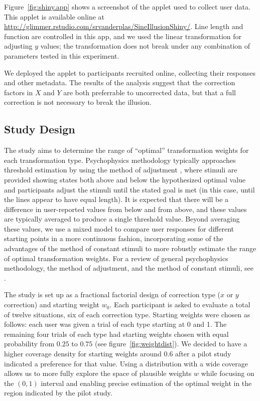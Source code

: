 \documentclass[11pt]{isuthesis}\usepackage[]{graphicx}\usepackage[]{color}
\begin{document}
Figure~\ref{fig:shiny.app} shows a screenshot of the applet used to collect user data. This applet is  available online at \url{http://glimmer.rstudio.com/srvanderplas/SineIllusionShiny/}. 
Line length and function are controlled in this app, and we used the linear transformation for adjusting $y$ values; the transformation does not break under any combination of parameters tested in this experiment. 


\noindent
We deployed the applet to participants recruited online, collecting their responses and other metadata. The results of the analysis suggest that the correction factors in $X$ and $Y$ are both preferrable to uncorrected data, but that a full correction is not necessary to break the illusion.



\subsection{Study Design}
The study aims to determine the range of ``optimal'' transformation weights for each transformation type. Psychophysics methodology typically approaches threshold estimation by using the method of adjustment \citep{goldstein}, where  stimuli are provided showing states both above and below the hypothesized optimal value and  participants adjust the stimuli until the stated goal is met (in this case, until the lines appear to have equal length). It is expected that there will be a difference in user-reported values from below and from above, and these values are typically averaged to produce a single threshold value. Beyond averaging these values, we use a mixed model to compare user responses for different starting points in a more continuous fashion, incorporating some of the advantages of the method of constant stimuli to more robustly estimate the range of optimal transformation weights. For a review of general psychophysics methodology, the method of adjustment, and the method of constant stimuli, see \citet{goldstein}.

The study is set up as a fractional factorial design of correction type ($x$ or $y$ correction) and starting weight $w_0$. Each participant is asked to evaluate a total of twelve situations, six of each correction type.
Starting weights were chosen as follows: each user was given a trial of each type starting at 0 and 1. The remaining four trials of each type had starting weights chosen with equal probability from $0.25$ to $0.75$ 
(see figure~\ref{fig:weightdist}). 
We decided to  have a higher coverage density for starting weights around 0.6 after a pilot study indicated a preference for that value. Using a distribution with a wide coverage allows us to more fully explore the space of plausible weights $w$ while focusing on the $(0,1)$ interval and enabling precise estimation of the optimal weight in the region indicated by the pilot study.
\end{document}
